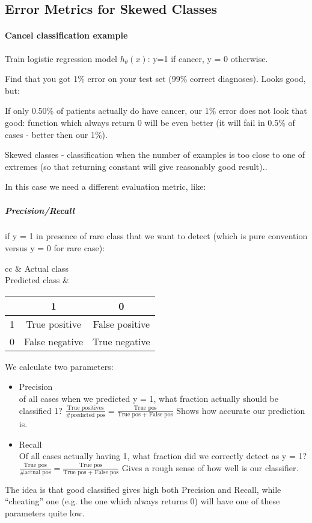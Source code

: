 \documentclass{scrartcl}
\begin{document}
\subsection{Error Metrics for Skewed Classes}
\label{sec:11-3}

\paragraph{Cancel classification example}
Train logistic regression model $h_\theta(x)$: y=1 if cancer, y = 0
otherwise.

Find that you got 1\% error on your test set (99\% correct diagnoses).
Looks good, but:

If only 0.50\% of patients actually do have cancer, our 1\% error does
not look that good: function which always return 0 will be even better
(it will fail in 0.5\% of cases - better then our 1\%).

Skewed classes - classification when the number of examples is too
close to one of extremes (so that returning constant will give
reasonably good result)..

In this case we need a different evaluation metric, like:

\subparagraph{Precision/Recall} if y = 1 in presence of rare class
that we want to detect (which is pure convention versus y = 0 for rare
case):

\begin{tabular}{cc}
  \quad & Actual class \\
  Predicted class &
  \begin{tabular}{c|c|c}
    \quad & 1 & 0 \\
    \hline
    1 & True positive & False positive \\
    0 & False negative & True negative 
  \end{tabular}
\end{tabular}

We calculate two parameters:
\begin{itemize}
\item Precision \\
  of all cases when we predicted y = 1, what fraction actually should
  be classified 1? $\frac{\textrm{True positives}}{\textrm{\#predicted
      pos}} = \frac{\textrm{True pos}}{\textrm{True pos + False pos}}$
  Shows how accurate our prediction is.
\item Recall \\
  Of all cases actually having 1, what fraction did we correctly
  detect as y = 1? $\frac{\textrm{True pos}}{\textrm{\#actual pos}} =
  \frac{\textrm{True pos}}{\textrm{True pos + False pos}}$ Gives a
  rough sense of how well is our classifier.
\end{itemize}
The idea is that good classified gives high both Precision and Recall,
while ``cheating'' one (e.g. the one which always returns 0) will have
one of these parameters quite low.
\end{document}
